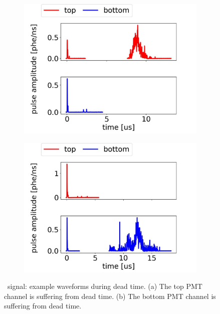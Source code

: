 \begin{figure}
	\centering
	\begin{subfigure}[b]{0.8\textwidth}
		\centering
		\includegraphics[width=\figurewidth,clip,trim={0 0 0 0}]{Figures/GasTest/exampleWaveforms/proc64767DeadTime1.jpg}
		\caption{}
		\label{fig:ptfe fluo c}
	\end{subfigure}
	\par\bigskip
	\begin{subfigure}[b]{0.8\textwidth}
		\centering
		\includegraphics[width=\figurewidth,clip,trim={0 0 0 0}]{Figures/GasTest/exampleWaveforms/proc64767DeadTime2.jpg}
		\caption{}
		\label{fig:ptfe fluo d}
	\end{subfigure}
	\caption[\gtest\ signal: example waveforms during dead time.]{\gtest\ signal: example waveforms during dead time. (a) The top PMT channel is suffering from dead time. (b) The bottom PMT channel is suffering from dead time. }

	\label{fig:pulse dead time}
\end{figure}

